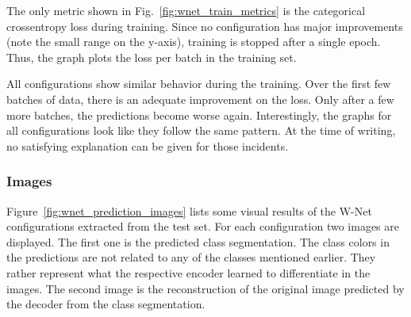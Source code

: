 The only metric shown in Fig.~\ref{fig:wnet_train_metrics} is the categorical crossentropy loss during training. Since no configuration has major improvements (note the small range on the y-axis), training is stopped after a single epoch. Thus, the graph plots the loss per batch in the training set.

All configurations show similar behavior during the training. Over the first few batches of data, there is an adequate improvement on the loss. Only after a few more batches, the predictions become worse again. Interestingly, the graphs for all configurations look like they follow the same pattern. At the time of writing, no satisfying explanation can be given for those incidents.

\subsubsection{Images}
Figure~\ref{fig:wnet_prediction_images} lists some visual results of the W-Net configurations extracted from the test set. For each configuration two images are displayed. The first one is the predicted class segmentation. The class colors in the predictions are not related to any of the classes mentioned earlier. They rather represent what the respective encoder learned to differentiate in the images. The second image is the reconstruction of the original image predicted by the decoder from the class segmentation.

